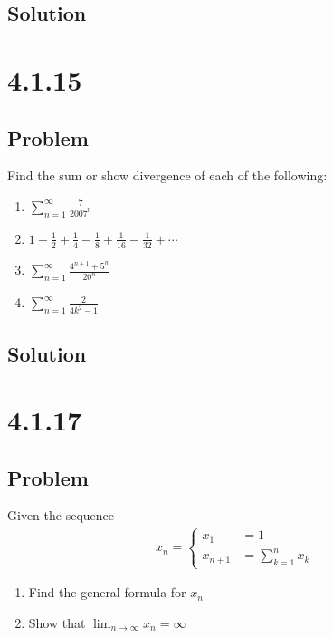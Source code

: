 \documentclass[12pt]{article}
\begin{document}
\subsection*{Solution}



\section*{4.1.15}

\subsection*{Problem}
Find the sum or show divergence of each of the following:
\begin{enumerate}
    \item $\sum_{n = 1}^\infty \frac{7}{2007^n}$
    \item $1 - \frac{1}{2} + \frac{1}{4} - \frac{1}{8} + \frac{1}{16} - \frac{1}{32} + \cdots$
    \item $\sum_{n = 1}^\infty \frac{4^{n + 1} + 5^n}{20^n}$
    \item $\sum_{n = 1}^\infty \frac{2}{4k^2 - 1}$
\end{enumerate}

\subsection*{Solution}



\section*{4.1.17}

\subsection*{Problem}
Given the sequence
\begin{align}
    x_n = \begin{cases}
        x_1 &= 1 \\
        x_{n + 1} &= \sum_{k = 1}^n x_k
    \end{cases}
\end{align}
\begin{enumerate}
    \item Find the general formula for $x_n$
    \item Show that $\lim_{n \to \infty} x_n = \infty$
\end{enumerate}
\end{document}

